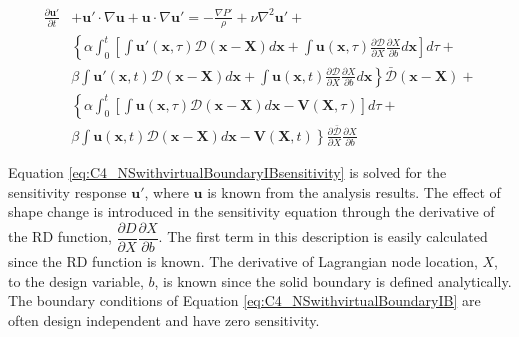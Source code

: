 \begin{align}\label{eq:C4_NSwithvirtualBoundaryIBsensitivity}
    \frac{\partial \mathbf{u}'}{\partial t} &+ 
    \mathbf{u}' \cdot \nabla \mathbf{u} +
    \mathbf{u} \cdot \nabla \mathbf{u}' = 
    -\frac{\nabla P'}{\rho} + 
    \nu \nabla^2 \mathbf{u}' + \nonumber \\
    &\left\{
    \alpha
    \int_0^t
    \left[
        \int \mathbf{u}'(\mathbf{x}, \tau) \mathcal{D}(\mathbf{x} - \mathbf{X}) d\mathbf{x} + 
        \int \mathbf{u}(\mathbf{x}, \tau) \frac{\partial \mathcal{D}}{\partial X} \frac{\partial X}{\partial b} d\mathbf{x}
    \right] d\tau \right.
    + \nonumber \\
    &
    \left.
    \beta
    \int \mathbf{u}'(\mathbf{x}, t) \mathcal{D}(\mathbf{x} - \mathbf{X}) d\mathbf{x} +
    \int \mathbf{u}(\mathbf{x}, t) \frac{\partial \mathcal{D}}{\partial X} \frac{\partial X}{\partial b} d\mathbf{x}
    \right\} \bar{\mathcal{D}}(\mathbf{x} - \mathbf{X}) + \nonumber \\
    &\left\{
    \alpha
    \int_0^t
    \left[
        \int \mathbf{u}(\mathbf{x}, \tau) \mathcal{D}(\mathbf{x} - \mathbf{X}) d\mathbf{x} - \mathbf{V}(\mathbf{X}, \tau)
    \right] d\tau \right.
    + \nonumber \\
    &
    \left.
    \beta
    \int \mathbf{u}(\mathbf{x}, t) \mathcal{D}(\mathbf{x} - \mathbf{X}) d\mathbf{x} - \mathbf{V}(\mathbf{X}, t)
    \right\}
    \frac{\partial \bar{\mathcal{D}}}{\partial X} \frac{\partial X}{\partial b}
\end{align}

Equation \eqref{eq:C4_NSwithvirtualBoundaryIBsensitivity} is solved for the sensitivity response $\mathbf{u}'$, where $\mathbf{u}$ is known from the analysis results. The effect of shape change is introduced in the sensitivity equation through the derivative of the RD function, $\dfrac{\partial D}{\partial X} \dfrac{\partial X}{\partial b}$. The first term in this description is easily calculated since the RD function is known. The derivative of Lagrangian node location, $X$, to the design variable, $b$, is known since the solid boundary is defined analytically. The boundary conditions of Equation \eqref{eq:C4_NSwithvirtualBoundaryIB} are often design independent and have zero sensitivity.

